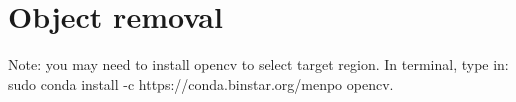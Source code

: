 \documentclass{extarticle}
\theoremstyle{definition}
\theoremstyle{definition}
\begin{document}
\section{Object removal}
Note: you may need to install opencv to select target region. In terminal, type in: sudo conda install -c https://conda.binstar.org/menpo opencv.
%
%
%
%
%
\end{document}
